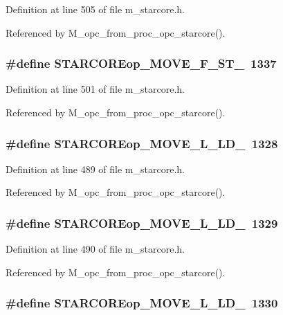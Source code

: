 Definition at line 505 of file m\_\-starcore.h.

Referenced by M\_\-opc\_\-from\_\-proc\_\-opc\_\-starcore().
\subsubsection{\setlength{\rightskip}{0pt plus 5cm}\#define STARCOREop\_\-MOVE\_\-F\_\-ST\_~1337}\label{m__starcore_8h_7462bd324b071071a80824bf443a6d05}




Definition at line 501 of file m\_\-starcore.h.

Referenced by M\_\-opc\_\-from\_\-proc\_\-opc\_\-starcore().
\subsubsection{\setlength{\rightskip}{0pt plus 5cm}\#define STARCOREop\_\-MOVE\_\-L\_\-LD\_~1328}\label{m__starcore_8h_0cd1d4c8368ac1eb06aee734a32594b2}




Definition at line 489 of file m\_\-starcore.h.

Referenced by M\_\-opc\_\-from\_\-proc\_\-opc\_\-starcore().
\subsubsection{\setlength{\rightskip}{0pt plus 5cm}\#define STARCOREop\_\-MOVE\_\-L\_\-LD\_~1329}\label{m__starcore_8h_ffa1e0cc94b46550aa969040e389e17d}




Definition at line 490 of file m\_\-starcore.h.

Referenced by M\_\-opc\_\-from\_\-proc\_\-opc\_\-starcore().
\subsubsection{\setlength{\rightskip}{0pt plus 5cm}\#define STARCOREop\_\-MOVE\_\-L\_\-LD\_~1330}\label{m__starcore_8h_edb384c69a1a5f089a1f230a61f394cc}




